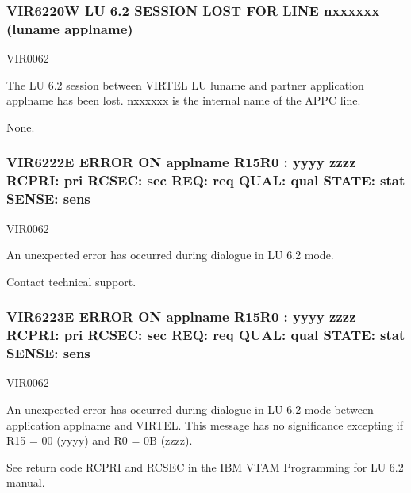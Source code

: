 \documentclass[letterpaper,10pt,english]{sphinxmanual}
\begin{document}
\subsubsection{VIR6220W LU 6.2 SESSION LOST FOR LINE n\sphinxhyphen{}xxxxxx (luname \textendash{} applname)}
\label{\detokenize{messages:vir6220w-lu-6-2-session-lost-for-line-n-xxxxxx-luname-applname}}\begin{description}
\sphinxAtStartPar
VIR0062

\sphinxAtStartPar
The LU 6.2 session between VIRTEL LU luname and partner application applname has been lost. n\sphinxhyphen{}xxxxxx is the internal name of the APPC line.

\sphinxAtStartPar
None.

\end{description}


\subsubsection{VIR6222E ERROR ON applname \sphinxhyphen{} R15\sphinxhyphen{}R0 : yyyy zzzz RCPRI: pri RCSEC: sec REQ: req QUAL: qual STATE: stat SENSE: sens}
\label{\detokenize{messages:vir6222e-error-on-applname-r15-r0-yyyy-zzzz-rcpri-pri-rcsec-sec-req-req-qual-qual-state-stat-sense-sens}}\begin{description}
\sphinxAtStartPar
VIR0062

\sphinxAtStartPar
An unexpected error has occurred during dialogue in LU 6.2 mode.

\sphinxAtStartPar
Contact technical support.

\end{description}


\subsubsection{VIR6223E ERROR ON applname \sphinxhyphen{} R15\sphinxhyphen{}R0 : yyyy zzzz RCPRI: pri RCSEC: sec REQ: req QUAL: qual STATE: stat SENSE: sens}
\label{\detokenize{messages:vir6223e-error-on-applname-r15-r0-yyyy-zzzz-rcpri-pri-rcsec-sec-req-req-qual-qual-state-stat-sense-sens}}\begin{description}
\sphinxAtStartPar
VIR0062

\sphinxAtStartPar
An unexpected error has occurred during dialogue in LU 6.2 mode between application applname and VIRTEL. This message has no significance excepting if R15 = 00 (yyyy) and R0 = 0B (zzzz).

\sphinxAtStartPar
See return code RCPRI and RCSEC in the IBM VTAM Programming for LU 6.2 manual.

\end{description}
\end{document}
